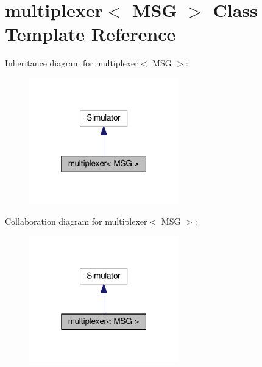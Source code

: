 \hypertarget{classmultiplexer}{}\section{multiplexer$<$ M\+SG $>$ Class Template Reference}
\label{classmultiplexer}


Inheritance diagram for multiplexer$<$ M\+SG $>$\+:
\nopagebreak
\begin{figure}[H]
\begin{center}
\leavevmode
\includegraphics[width=184pt]{classmultiplexer__inherit__graph}
\end{center}
\end{figure}


Collaboration diagram for multiplexer$<$ M\+SG $>$\+:
\nopagebreak
\begin{figure}[H]
\begin{center}
\leavevmode
\includegraphics[width=184pt]{classmultiplexer__coll__graph}
\end{center}
\end{figure}
